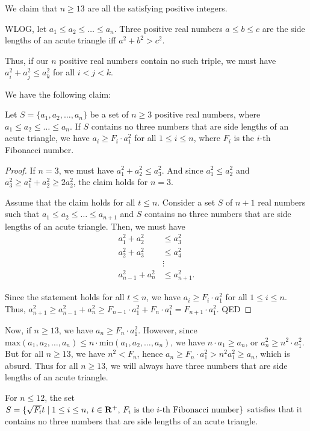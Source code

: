 \begin{solution}
We claim that $n\ge 13$ are all the satisfying positive integers.

WLOG, let $a_1\le a_2\le\hdots\le a_n$. Three positive real numbers $a\le b \le c$ are the side lengths of an acute triangle iff $a^2+b^2>c^2$. 

Thus, if our $n$ positive real numbers contain no such triple, we must have $a_i^2+a_j^2 \le a_k^2$ for all $i<j<k$. 

We have the following claim:

\begin{lemma}
Let $S=\{a_1, a_2, \hdots, a_n\}$ be a set of $n\ge 3$ positive real numbers, where $a_1\le a_2\le\hdots\le a_n$. If $S$ contains no three numbers that are side lengths of an acute triangle, we have $a_i\ge F_i\cdot a_1^2$ for all $1\le i\le n$, where $F_i$ is the $i$-th Fibonacci number.
\end{lemma}

\begin{proof}
If $n=3$, we must have $a_1^2+a_2^2\le a_3^2$. And since $a_1^2\le a_2^2$ and $a_3^2\ge a_1^2+a_2^2\ge 2a_2^2$, the claim holds for $n=3$.

Assume that the claim holds for all $t\le n$. Consider a set $S$ of $n+1$ real numbers such that $a_1\le a_2\le\hdots\le a_{n+1}$ and $S$ contains no three numbers that are side lengths of an acute triangle. Then, we must have
\begin{align*}
a_1^2+a_2^2&\le a_3^2\\
a_2^2+a_3^2&\le a_4^2\\		
&\vdots\\
a_{n-1}^2+a_{n}^2&\le a_{n+1}^2.
\end{align*}

Since the statement holds for all $t\le n$, we have $a_i\ge F_i\cdot a_1^2$ for all $1\le i\le n$. 
Thus, $a_{n+1}^2\ge a_{n-1}^2+a_{n}^2\ge F_{n-1}\cdot a_1^2+F_n\cdot a_1^2=F_{n+1}\cdot a_1^2$. QED
\end{proof}

Now, if $n\ge 13$, we have $a_n\ge F_n\cdot a_1^2$. However, since $\text{max}(a_1,a_2,\dots,a_n) \le n \cdot\text{min}(a_1,a_2, \dots,a_n)$, we have $n\cdot a_1\ge a_n$, or $a_n^2\ge n^2\cdot a_1^2$. But for all $n\ge 13$, we have $n^2<F_n$, hence $a_n\ge F_n \cdot a_1^2>n^2a_1^2\ge a_n$, which is absurd. Thus for all $n\ge 13$, we will always have three numbers that are side lengths of an acute triangle.

For $n\le 12$, the set $S=\{\sqrt{F_i}t\mid 1\le i\le n,\,t\in\mathbf R^+,\, F_i\text{ is the }i\text{-th Fibonacci number}\}$ satisfies that it contains no three numbers that are side lengths of an acute triangle.
\end{solution}
\pagebreak

